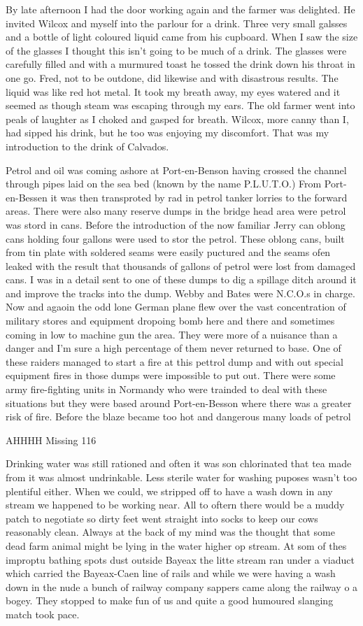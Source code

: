 By late afternoon I had the door working again and the farmer was
delighted. He invited Wilcox and myself into the parlour for a
drink. Three very small galsses and a bottle of light coloured liquid
came from his cupboard. When I saw the size of the glasses I thought
this isn't going to be much of a drink. The glasses were carefully
filled and with a murmured toast he tossed the drink down his throat
in one go. Fred, not to be outdone, did likewise and with disastrous
results. The liquid was like red hot metal. It took my breath away, my
eyes watered and it seemed as though steam was escaping through my
ears. The old farmer went into peals of laughter as I choked and
gasped for breath. Wilcox, more canny than I, had sipped his drink,
but he too was enjoying my discomfort. That was my introduction to the
drink of Calvados.

Petrol and oil was coming ashore at Port-en-Benson having crossed the
channel through pipes laid on the sea bed (known by the name
P.L.U.T.O.) From Port-en-Bessen it was then transproted by rad in
petrol tanker lorries to the forward areas. There were also many
reserve dumps in the bridge head area were petrol was stord in
cans. Before the introduction of the now familiar Jerry can oblong
cans holding four gallons were used to stor the petrol. These oblong
cans, built from tin plate with soldered seams were easily puctured
and the seams ofen leaked with the result that thousands of gallons of
petrol were lost from damaged cans. I was in a detail sent to one of
these dumps to dig a spillage ditch around it and improve the tracks
into the dump. Webby and Bates were N.C.O.s in charge. Now and agaoin
the odd lone German plane flew over the vast concentration of military
stores and equipment dropoing bomb here and there and sometimes coming
in low to machine gun the area. They were more of a nuisance than a
danger and I'm sure a high percentage of them never returned to
base. One of these raiders managed to start a fire at this pettrol
dump and with out special equipment fires in those dumps were
impossible to put out. There were some army fire-fighting units in
Normandy who were trainded to deal with these situations but they were
based around Port-en-Besson where there was a greater risk of
fire. Before the blaze became too hot and dangerous many loads of
petrol


AHHHH Missing 116

Drinking water was still rationed and often it was son chlorinated
that tea made from it was almost undrinkable. Less sterile water for
washing puposes wasn't too plentiful either. When we could, we
stripped off to have a wash down in any stream we happened to be
working near. All to oftern there would be a muddy patch to negotiate
so dirty feet went straight into socks to keep our cows reasonably
clean. Always at the back of my mind was the thought that some dead
farm animal might be lying in the water higher op stream. At som of
thes improptu bathing spots dust outside Bayeax the litte stream ran
under a viaduct which carried the Bayeax-Caen line of rails and while
we were having a wash down in the nude a bunch of railway company
sappers came along the railway o a bogey. They stopped to make fun of
us and quite a good humoured slanging match took pace.

